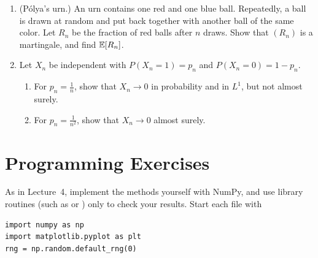 \begin{enumerate}[leftmargin=*]
    \begin{enumerate}[label=(\alph*)]
        \item Show that $\E[X_1\mathbf{1}_{\{M \leq t\}}] = \E\big[\frac{3}{4}M\mathbf{1}_{\{M \leq t\}}\big]$ for $0 \leq t \leq 1$. (One can show that this implies $\E[X_1 \mid M] = \frac{3}{4}M$, since the events $\{M \leq t\}$ generate $\sigma(M)$ and are closed under intersections.)
        \item Explain the result: given $M = m$, $X_1 = m$ with probability $\frac{1}{2}$, and otherwise $X_1$ is uniform on $[0, m]$. Check the tower property.
    \end{enumerate}
    \item (P\'olya's urn.) An urn contains one red and one blue ball. Repeatedly, a ball is drawn at random and put back together with another ball of the same color. Let $R_n$ be the fraction of red balls after $n$ draws. Show that $(R_n)$ is a martingale, and find $\mathbb{E}[R_n]$.
    \item Let $X_n$ be independent with $P(X_n = 1) = p_n$ and $P(X_n = 0) = 1 - p_n$.
    \begin{enumerate}[label=(\alph*)]
        \item For $p_n = \frac{1}{n}$, show that $X_n \to 0$ in probability and in $L^1$, but not almost surely.
        \item For $p_n = \frac{1}{n^2}$, show that $X_n \to 0$ almost surely.
    \end{enumerate}
\end{enumerate}

\section*{Programming Exercises}

\setlength{\emergencystretch}{3em}

As in Lecture~4, implement the methods yourself with NumPy, and use library routines (such as  or ) only to check your results. Start each file with
\begin{lstlisting}
import numpy as np
import matplotlib.pyplot as plt
rng = np.random.default_rng(0)
\end{lstlisting}

